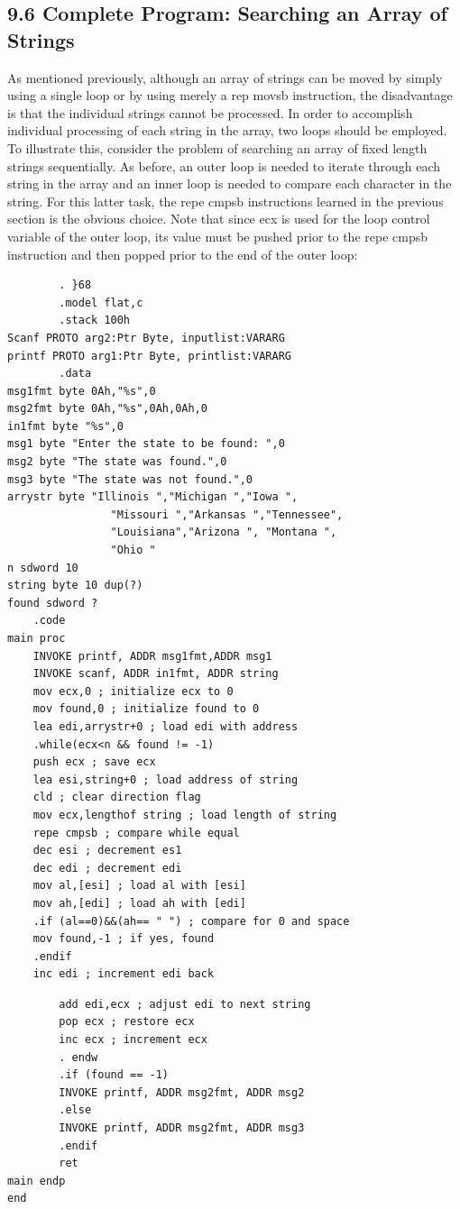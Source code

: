 \documentclass[10pt]{book}
\begin{document}
\begin{center}
\begin{center}
\begin{center}
\begin{center}
\subsection*{9.6 Complete Program: Searching an Array of Strings}
As mentioned previously, although an array of strings can be moved by simply using a single loop or by using merely a rep movsb instruction, the disadvantage is that the individual strings cannot be processed. In order to accomplish individual processing of each string in the array, two loops should be employed. To illustrate this, consider the problem of searching an array of fixed length strings sequentially. As before, an outer loop is needed to iterate through each string in the array and an inner loop is needed to compare each character in the string. For this latter task, the repe cmpsb instructions learned in the previous section is the obvious choice. Note that since ecx is used for the loop control variable of the outer loop, its value must be pushed prior to the repe cmpsb instruction and then popped prior to the end of the outer loop:

\begin{verbatim}
        . }68
        .model flat,c
        .stack 100h
Scanf PROTO arg2:Ptr Byte, inputlist:VARARG
printf PROTO arg1:Ptr Byte, printlist:VARARG
        .data
msg1fmt byte 0Ah,"%s",0
msg2fmt byte 0Ah,"%s",0Ah,0Ah,0
in1fmt byte "%s",0
msg1 byte "Enter the state to be found: ",0
msg2 byte "The state was found.",0
msg3 byte "The state was not found.",0
arrystr byte "Illinois ","Michigan ","Iowa ",
                "Missouri ","Arkansas ","Tennessee",
                "Louisiana","Arizona ", "Montana ",
                "Ohio "
n sdword 10
string byte 10 dup(?)
found sdword ?
    .code
main proc
    INVOKE printf, ADDR msg1fmt,ADDR msg1
    INVOKE scanf, ADDR in1fmt, ADDR string
    mov ecx,0 ; initialize ecx to 0
    mov found,0 ; initialize found to 0
    lea edi,arrystr+0 ; load edi with address
    .while(ecx<n && found != -1)
    push ecx ; save ecx
    lea esi,string+0 ; load address of string
    cld ; clear direction flag
    mov ecx,lengthof string ; load length of string
    repe cmpsb ; compare while equal
    dec esi ; decrement es1
    dec edi ; decrement edi
    mov al,[esi] ; load al with [esi]
    mov ah,[edi] ; load ah with [edi]
    .if (al==0)&&(ah== " ") ; compare for 0 and space
    mov found,-1 ; if yes, found
    .endif
    inc edi ; increment edi back
\end{verbatim}

\begin{verbatim}
        add edi,ecx ; adjust edi to next string
        pop ecx ; restore ecx
        inc ecx ; increment ecx
        . endw
        .if (found == -1)
        INVOKE printf, ADDR msg2fmt, ADDR msg2
        .else
        INVOKE printf, ADDR msg2fmt, ADDR msg3
        .endif
        ret
main endp
end
\end{verbatim}


\end{center}
\end{center}
\end{center}
\end{center}
\end{document}

